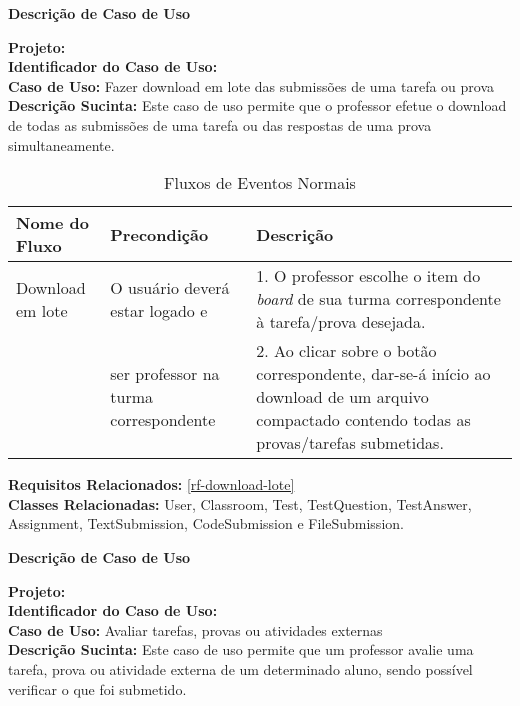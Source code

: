 \clearpage
\begin{flushright}    \textbf{Descrição de Caso de Uso}   \end{flushright}         
\noindent \textbf{Projeto:} \imprimirtitulo  \\
\textbf{Identificador do Caso de Uso:} \UC\label{uc-download-lote} \\
\textbf{Caso de Uso:} Fazer download em lote das submissões de uma tarefa ou prova \\
\noindent \textbf{Descrição Sucinta:} Este caso de uso permite que o professor efetue o download de todas as submissões de uma tarefa ou das respostas de uma prova simultaneamente.\\

\begin{table}[H]
	\centering \vspace{0.5cm} \footnotesize
	\caption{Fluxos de Eventos Normais}
	\begin{tabular}{|p{2.3cm}|p{2.5cm}|p{10cm}|} \hline  \rowcolor[rgb]{0.8,0.8,0.8}
		
		Nome do Fluxo & Precondição & Descrição  \\ \hline		
		
		Download em lote & O usuário deverá estar logado e & 1. O professor escolhe o item do \textit{board} de sua turma correspondente à tarefa/prova desejada.  \\
		{} &  ser professor na turma correspondente & 2. Ao clicar sobre o botão correspondente, dar-se-á início ao download de um arquivo compactado contendo todas as provas/tarefas submetidas.\\ \hline
		
		
	\end{tabular}
\end{table}


\noindent  \textbf{Requisitos Relacionados:} \ref{rf-download-lote}       \\ \textbf{Classes Relacionadas:} User, Classroom, Test, TestQuestion, TestAnswer, Assignment, TextSubmission, CodeSubmission e FileSubmission.

\newpage
\clearpage
\begin{flushright}    \textbf{Descrição de Caso de Uso}   \end{flushright}         
\noindent \textbf{Projeto:} \imprimirtitulo  \\
\textbf{Identificador do Caso de Uso:} \UC\label{uc-avaliar-individualmente} \\
\textbf{Caso de Uso:} Avaliar tarefas, provas ou atividades externas \\
\noindent \textbf{Descrição Sucinta:} Este caso de uso permite que um professor avalie uma tarefa, prova ou atividade externa de um determinado aluno, sendo possível verificar o que foi submetido.\\

